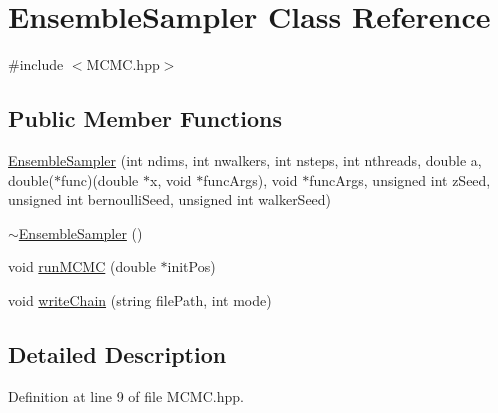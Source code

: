 \hypertarget{class_ensemble_sampler}{\section{Ensemble\-Sampler Class Reference}
\label{class_ensemble_sampler}
}


{\ttfamily \#include $<$M\-C\-M\-C.\-hpp$>$}

\subsection*{Public Member Functions}
\begin{DoxyCompactItemize}
\item 
\hyperlink{class_ensemble_sampler_a2c9b3046553b31fe5b39792404c8431d}{Ensemble\-Sampler} (int ndims, int nwalkers, int nsteps, int nthreads, double a, double($\ast$func)(double $\ast$x, void $\ast$func\-Args), void $\ast$func\-Args, unsigned int z\-Seed, unsigned int bernoulli\-Seed, unsigned int walker\-Seed)
\item 
\hyperlink{class_ensemble_sampler_a3c74a117a85a6230bb48533e88a4cec4}{$\sim$\-Ensemble\-Sampler} ()
\item 
void \hyperlink{class_ensemble_sampler_a7673dd0aeca4848f3c4b3591192b606a}{run\-M\-C\-M\-C} (double $\ast$init\-Pos)
\item 
void \hyperlink{class_ensemble_sampler_a653fe4e94639dd1f09883bb5701d9809}{write\-Chain} (string file\-Path, int mode)
\end{DoxyCompactItemize}


\subsection{Detailed Description}


Definition at line 9 of file M\-C\-M\-C.\-hpp.



